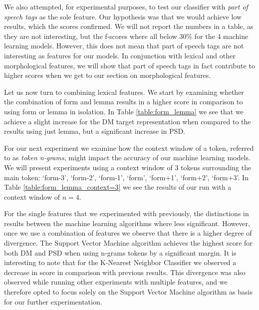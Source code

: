 We also attempted, for experimental purposes, to test our classifier with \textit{part of speech tags} as the sole feature. Our hypothesis was that we would achieve low results, which the scores confirmed. We will not report the numbers in a table, as they are not interesting, but the f-scores where all below 30\% for the 4 machine learning models. However, this does not mean that part of speech tags are not interesting as features for our models. In conjunction with lexical and other morphological features, we will show that part of speech tags in fact contribute to higher scores when we get to our section on morphological features.

Let us now turn to combining lexical features. We start by examining whether the combination of form and lemma results in a higher score in comparison to using form or lemma in isolation. In Table \ref{table:form_lemma} we see that we achieve a slight increase for the DM target representation when compared to the results using just lemma, but a significant increase in PSD.

For our next experiment we examine how the context window of a token, referred to as \textit{token n-grams}, might impact the accuracy of our machine learning models. We will present experiments using a context window of 3 tokens surrounding the main token: `form-3', `form-2', `form-1', `form', `form+1', `form+2', `form+3'. In Table \ref{table:form_lemma_context=3} we see the results of our run with a context window of $n=4$.

For the single features that we experimented with previously, the distinctions in results between the machine learning algorithms where less significant. However, once we use a combination of features we observe that there is a higher degree of divergence. The Support Vector Machine algorithm achieves the highest score for both DM and PSD when using n-grams tokens by a significant margin. It is interesting to note that for the K-Nearest Neighbor Classifier we observed a decrease in score in comparison with previous results. This divergence was also observed while running other experiments with multiple features, and we therefore opted to focus solely on the Support Vector Machine algorithm as basis for our further experimentation.

